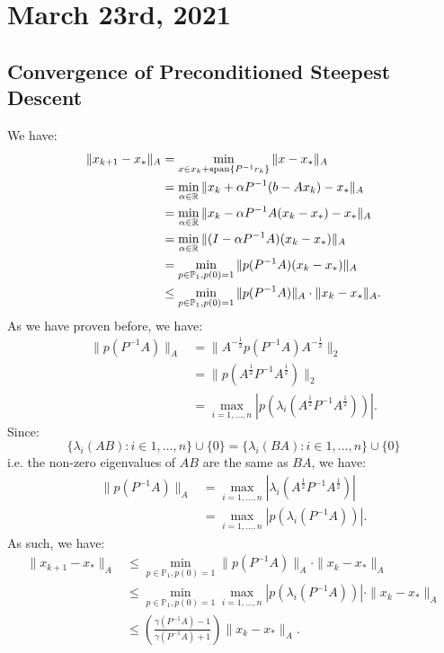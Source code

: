 \documentclass[../main/main.tex]{subfiles}
\begin{document}
\section{March 23rd, 2021}
\subsection{Convergence of Preconditioned Steepest Descent}
We have: \begin{align*}
           \|x_{k+1}-x_{*}\|_{A} &= \min_{x\in x_{k}+\operatorname{span} \{P^{-1}r_{k}\}} \|x-x_{*}\|_{A}\\
                                 &= \min_{\alpha\in\mathbb{R}}\|x_{k}+\alpha P^{-1}(b-Ax_{k})-x_{*}\|_{A}\\
                                 &= \min_{\alpha\in\mathbb{R}}\|x_{k}-\alpha P^{-1}A(x_{k}-x_{*})-x_{*}\|_{A}\\
                                 &= \min_{\alpha\in\mathbb{R}} \|(I-\alpha P^{-1} A)(x_{k}-x_{*})\|_{A}\\
                                 &= \min_{p\in\mathbb{P}_{1}, p(0)=1} \|p(P^{-1}A)(x_{k}-x_{*})\|_{A}\\
           &\leq \min_{p\in\mathbb{P}_{1}, p(0)=1} \|p(P^{-1}A)\|_{A}\cdot\|x_{k}-x_{*}\|_{A}
           .\end{align*}
         As we have proven before, we have:
         \begin{align*}
           \|p(P^{-1} A)\|_{A} &= \|A^{-\frac{1}{2}} p(P^{-1} A) A^{-\frac{1}{2}}\|_{2} \\
                               &=\|p(A^{\frac{1}{2}}P^{-1}A^{\frac{1}{2}})\|_{2}\\
                               &=\max_{i = 1, \ldots , n}\left|p(\lambda_{i}(A^{\frac{1}{2}}P^{-1} A^{ \frac{1}{2} }))\right|
           .\end{align*}
         Since: \[
\{\lambda_{i}(AB): i \in 1 , \ldots , n\} \cup \{0\} = \{\lambda_{i} (BA): i \in 1, \ldots , n\}\cup \{0\}
         \] i.e. the non-zero eigenvalues of $AB$ are the same as $BA$, we have:
         \begin{align*}
           \|p(P^{-1} A)\|_{A} &=\max_{i = 1, \ldots , n}\left|\lambda_{i}(A^{\frac{1}{2}}P^{-1} A^{ \frac{1}{2} })\right|\\
           &=\max_{i = 1, \ldots,n}\left|p(\lambda_{i}(P^{-1} A))\right|
           .\end{align*}
         As such, we have:
         \begin{align*}
           \|x_{k+1}-x_{*}\|_{A} &\leq \min_{p\in\mathbb{P}_{1}, p(0)=1} \|p(P^{-1}A)\|_{A}\cdot\|x_{k}-x_{*}\|_{A}\\
           &\leq \min_{p\in\mathbb{P}_{1}, p(0)=1} \max_{i = 1, \ldots,n}\left|p(\lambda_{i}(P^{-1} A))\right|\cdot\|x_{k}-x_{*}\|_{A}\\
           &\leq \left(\frac{\gamma(P^{-1}A)-1}{\gamma(P^{-1}A)+1} \right)\|x_{k}-x_{*}\|_{A}
           .\end{align*}
\end{document}
